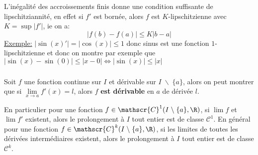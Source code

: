 \subsection*{}

L'inégalité des accroissements finis donne une condition suffisante de lipschitziannité, en effet si \(f'\) est bornée, alors \(f\) est \(K\)-lipschitzienne avec \(K = \sup|f'|\), ie on a:
\[
   |f(b) - f(a)| \leq K|b-a|
\]
\underline{Exemple:} \(|\sin(x)'| = |\cos(x)| \leq 1\) donc sinus est une fonction \(1\)-lipschitzienne et donc on montre par exemple que \(|\sin(x) - \sin(0)| \leq |x - 0| \Longleftrightarrow |\sin(x)| \leq |x|\)

\subsection*{}

Soit \(f\) une fonction continue sur \(I\) et dérivable sur \(I \; \backslash \; \{a\}\), alors on peut montrer que si \(\underset{x \rightarrow a}{\lim} f'(x) =  l\), alors \(f\) \textbf{est dérivable} en \(a\) de dérivée \(l\).\<

En particulier pour une fonction \(f \in \mathscr{C}^1(I \; \backslash \; \{a\}, \R)\), si \({\lim}f\) et \({\lim}f'\) existent, alors le prolongement à \(I\) tout entier est de classe \(\mathscr{C}^1\).\+
En général pour une fonction \(f \in \mathscr{C}^k(I \; \backslash \; \{a\}, \R)\), si les limites de toutes les dérivées intermédiaires existent, alors le prolongement à \(I\) tout entier est de classe \(\mathscr{C}^k\).
\chapter*{} %

\subsection*{}

